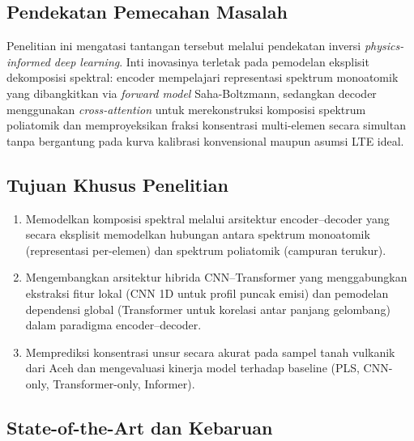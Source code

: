 \documentclass[12pt, a4paper]{article}
\begin{document}
\subsection{Pendekatan Pemecahan Masalah}
Penelitian ini mengatasi tantangan tersebut melalui pendekatan inversi \textit{physics-informed deep learning}. Inti inovasinya terletak pada pemodelan eksplisit dekomposisi spektral: encoder mempelajari representasi spektrum monoatomik yang dibangkitkan via \textit{forward model} Saha-Boltzmann, sedangkan decoder menggunakan \textit{cross-attention} untuk merekonstruksi komposisi spektrum poliatomik dan memproyeksikan fraksi konsentrasi multi-elemen secara simultan tanpa bergantung pada kurva kalibrasi konvensional maupun asumsi LTE ideal.

\subsection{Tujuan Khusus Penelitian}
\begin{enumerate}[label=\arabic*.]
    \item Memodelkan komposisi spektral melalui arsitektur encoder–decoder yang secara eksplisit memodelkan hubungan antara spektrum monoatomik (representasi per-elemen) dan spektrum poliatomik (campuran terukur).
    \item Mengembangkan arsitektur hibrida CNN–Transformer yang menggabungkan ekstraksi fitur lokal (CNN 1D untuk profil puncak emisi) dan pemodelan dependensi global (Transformer untuk korelasi antar panjang gelombang) dalam paradigma encoder–decoder.
    \item Memprediksi konsentrasi unsur secara akurat pada sampel tanah vulkanik dari Aceh dan mengevaluasi kinerja model terhadap baseline (PLS, CNN-only, Transformer-only, Informer).
\end{enumerate}


\subsection{State-of-the-Art dan Kebaruan}
\end{document}
